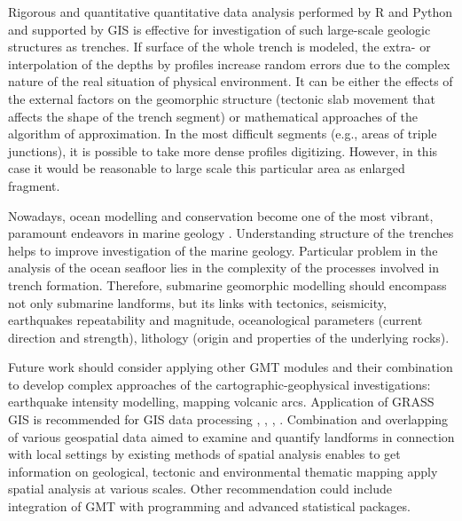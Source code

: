 \documentclass[11pt,a4paper]{report}
\begin{document}
{Rigorous and quantitative quantitative data analysis performed by R and Python and supported by \ac{GIS} is effective for investigation of such large-scale geologic structures as trenches. If surface of the whole trench is  modeled, the extra- or interpolation of the depths by profiles increase random errors due to the complex nature of the real situation of physical environment. It can be either the effects of the external factors on the geomorphic structure (tectonic slab movement that affects the shape of the trench segment) or mathematical approaches of the algorithm of approximation. In the most difficult segments (e.g., areas of triple junctions), it is possible to take more dense profiles digitizing. However, in this case it would be reasonable to large scale this particular area as enlarged fragment.

Nowadays, ocean modelling and conservation become one of the most vibrant, paramount endeavors in marine geology \cite{RichmondKotowicz2015}. Understanding structure of the trenches helps to improve investigation of the marine geology. Particular problem in the analysis of the ocean seafloor lies in the complexity of the processes involved in trench formation. Therefore, submarine geomorphic modelling should encompass not only submarine landforms, but its links with tectonics, seismicity, earthquakes repeatability and magnitude, oceanological parameters (current direction and strength), lithology (origin and properties of the underlying rocks).

Future work should consider applying other \ac{GMT} modules and their combination to develop complex approaches of the cartographic-geophysical investigations: earthquake intensity modelling, mapping volcanic arcs. Application of \ac{GRASS GIS} is recommended for \ac{GIS} data processing \cite{Lemenkova202016}, \cite{Lemenkova202022}, \cite{Lemenkova202011}, \cite{Lemenkova202026}. Combination and overlapping of various geospatial data aimed to examine and quantify landforms in connection with local settings by existing methods of spatial analysis enables to get information on geological, tectonic and environmental thematic mapping apply spatial analysis at various scales. Other recommendation could include integration of \ac{GMT} with programming and advanced statistical packages.

}
\end{document}
